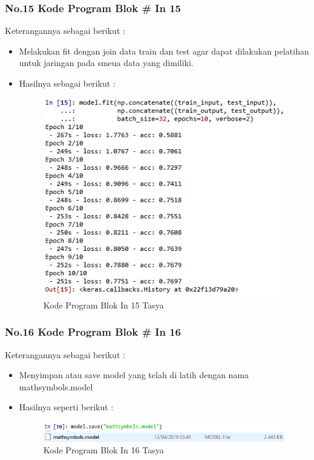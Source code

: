 \subsubsection{No.15 Kode Program Blok \# In 15}

Keterangannya sebagai berikut :\\
\begin{itemize}
\item Melakukan fit dengan join data train dan test agar dapat dilakukan pelatihan untuk jaringan pada smeua data yang dimiliki.
\item Hasilnya sebagai berikut :\\
\begin{figure}[ht]
\centering
\includegraphics[scale=0.5]{figures/Chapter 7/1164086/Praktek/chapter7tasya29.png}
\caption{Kode Program Blok In 15 Tasya}
\label{Praktek}
\end{figure}
\end{itemize}

\subsubsection{No.16 Kode Program Blok \# In 16}

Keterangannya sebagai berikut :\\
\begin{itemize}
\item Menyimpan atau save model yang telah di latih dengan nama mathsymbols.model 
\item Hasilnya seperti berikut :\\
\begin{figure}[ht]
\centering
\includegraphics[scale=0.5]{figures/Chapter 7/1164086/Praktek/chapter7tasya30.png}
\caption{Kode Program Blok In 16 Tasya}
\label{Praktek}
\end{figure}
\end{itemize}

